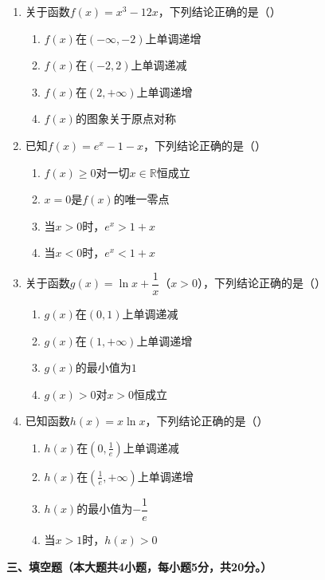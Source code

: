 \documentclass[12pt, a4paper]{ctexart}
\begin{document}
\begin{enumerate}[label=\arabic*.]

\item 关于函数$f(x)=x^3-12x$，下列结论正确的是（\quad）
\begin{enumerate}[label=]
\item $f(x)$在$(-\infty,-2)$上单调递增
\item $f(x)$在$(-2,2)$上单调递减
\item $f(x)$在$(2,+\infty)$上单调递增
\item $f(x)$的图象关于原点对称
\end{enumerate}

\item 已知$f(x)=e^x-1-x$，下列结论正确的是（\quad）
\begin{enumerate}[label=]
\item $f(x)\geq 0$对一切$x\in\mathbb{R}$恒成立
\item $x=0$是$f(x)$的唯一零点
\item 当$x>0$时，$e^x>1+x$
\item 当$x<0$时，$e^x<1+x$
\end{enumerate}

\item 关于函数$g(x)=\ln x+\dfrac{1}{x}$（$x>0$），下列结论正确的是（\quad）
\begin{enumerate}[label=]
\item $g(x)$在$(0,1)$上单调递减
\item $g(x)$在$(1,+\infty)$上单调递增
\item $g(x)$的最小值为$1$
\item $g(x)>0$对$x>0$恒成立
\end{enumerate}

\item 已知函数$h(x)=x\ln x$，下列结论正确的是（\quad）
\begin{enumerate}[label=]
\item $h(x)$在$(0,\frac{1}{e})$上单调递减
\item $h(x)$在$(\frac{1}{e},+\infty)$上单调递增
\item $h(x)$的最小值为$-\dfrac{1}{e}$
\item 当$x>1$时，$h(x)>0$
\end{enumerate}

\end{enumerate}

\vspace{0.5em}

\noindent\textbf{三、填空题（本大题共4小题，每小题5分，共20分。）}
\end{document}
